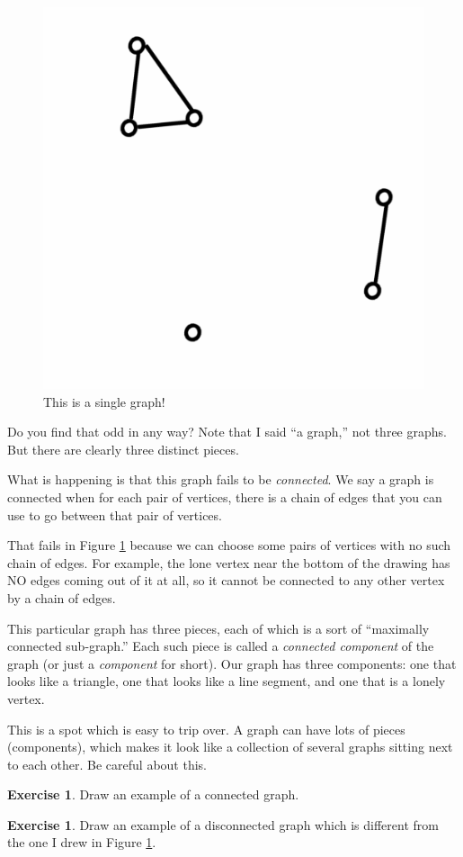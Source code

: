 \documentclass[12pt,letterpaper]{article}
\theoremstyle{definition}
\newtheorem{exercise}[question]{Exercise}
\begin{document}
\begin{figure}[h]
\centering
\includegraphics[width=.5\textwidth]{images/disconnected.png}
\caption{This is a single graph!}
\label{figure:disconnected}
\end{figure}

Do you find that odd in any way? Note that I said ``a graph,'' not three graphs. But there are clearly 
three distinct pieces.

What is happening is that this graph fails to be \emph{connected}. We say a graph is connected when
for each pair of vertices, there is a chain of edges that you can use to go between that pair of vertices.

That fails in Figure \ref{figure:disconnected} because we can choose some pairs of vertices with no such 
chain of edges. For example, the lone vertex near the bottom of the drawing has NO edges coming out of
it at all, so it cannot be connected to any other vertex by a chain of edges.

This particular graph has three pieces, each of which is a sort of ``maximally connected sub-graph.''
Each such piece is called a \emph{connected component} of the graph (or just a \emph{component} for short).
Our graph has three components: one that looks like a triangle, one that looks like a line segment, and one that 
is a lonely vertex.

This is a spot which is easy to trip over. A graph can have lots of pieces (components), which makes it look
like a collection of several graphs sitting next to each other. Be careful about this.

\begin{exercise}
Draw an example of a connected graph.
\end{exercise}

\begin{exercise}
Draw an example of a disconnected graph which is different from the one I drew in 
Figure \ref{figure:disconnected}.
\end{exercise}
\end{document}
